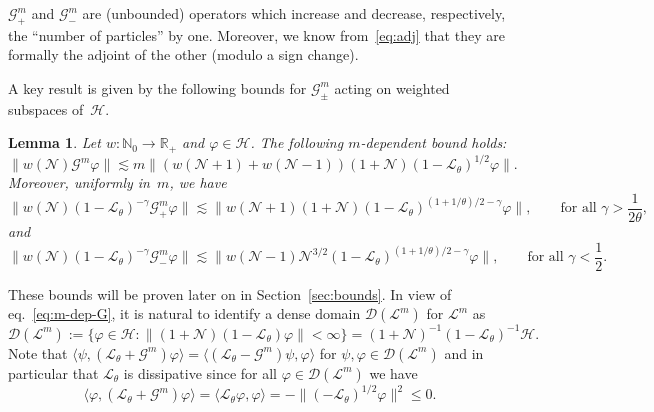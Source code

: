 \documentclass[10pt]{article}
\newcommand{\assign}{:=}
\newtheorem{lemma}{Lemma}
\begin{document}
\begin{remark}
  $\mathcal{G}_+^m$ and $\mathcal{G}_-^m$ are (unbounded) operators which
  increase and decrease, respectively, the ``number of particles'' by one.
  Moreover, we know from~{\eqref{eq:adj}} that they are formally the adjoint
  of the other (modulo a sign change).
\end{remark}

A key result is given by the following bounds for $\mathcal{G}_{\pm}^m$ acting
on weighted subspaces of~$\mathcal{H}$.

\begin{lemma}
  \label{lem:uniform-bds-G}Let $w : \mathbb{N}_0 \rightarrow \mathbb{R}_+$ and
  $\varphi \in \mathcal{H}$. The following $m$-dependent bound holds:
  \begin{equation}
    \| w (\mathcal{N}) \mathcal{G}^m \varphi \| \lesssim m \| (w (\mathcal{N}+
    1) + w (\mathcal{N}- 1)) (1 +\mathcal{N}) (1 -\mathcal{L}_{\theta})^{1 /
    2} \varphi \| . \label{eq:m-dep-G}
  \end{equation}
  Moreover, uniformly in~$m$, we have
  \begin{equation}
    \| w (\mathcal{N}) (1 -\mathcal{L}_{\theta})^{- \gamma} \mathcal{G}_+^m
    \varphi \| \lesssim \| w (\mathcal{N}+ 1) (1 +\mathcal{N}) (1
    -\mathcal{L}_{\theta})^{(1 + 1 / \theta) / 2 - \gamma} \varphi \|, \qquad
    \text{for all } \gamma > \frac{1}{2 \theta}, \label{eq:unifbdG1}
  \end{equation}
  and
  \begin{equation}
    \| w (\mathcal{N}) (1 -\mathcal{L}_{\theta})^{- \gamma} \mathcal{G}_-^m
    \varphi \| \lesssim \| w (\mathcal{N}- 1) \mathcal{N}^{3 / 2} (1
    -\mathcal{L}_{\theta})^{(1 + 1 / \theta) / 2 - \gamma} \varphi \|, \qquad
    \text{for all } \gamma < \frac{1}{2} . \label{eq:unifbdG2}
  \end{equation}
\end{lemma}

These bounds will be proven later on in Section~\ref{sec:bounds}. In view of
eq.~{\eqref{eq:m-dep-G}}, it is natural to identify a dense domain
$\mathcal{D} (\mathcal{L}^m)$ for $\mathcal{L}^m$ as
\[ \mathcal{D} (\mathcal{L}^m) \assign \{ \varphi \in \mathcal{H}: \| (1
   +\mathcal{N}) (1 -\mathcal{L}_{\theta}) \varphi \| < \infty \} = (1
   +\mathcal{N})^{- 1} (1 -\mathcal{L}_{\theta})^{- 1} \mathcal{H}. \]
Note that $\langle \psi, (\mathcal{L}_{\theta} +\mathcal{G}^m) \varphi \rangle
= \langle (\mathcal{L}_{\theta} -\mathcal{G}^m) \psi, \varphi \rangle$ for
$\psi, \varphi \in \mathcal{D} (\mathcal{L}^m)$ and in particular that
$\mathcal{L}_{\theta}$ is dissipative since for all $\varphi \in \mathcal{D}
(\mathcal{L}^m)$ we have
\[ \langle \varphi, (\mathcal{L}_{\theta} +\mathcal{G}^m) \varphi \rangle =
   \langle \mathcal{L}_{\theta} \varphi, \varphi \rangle = - \|
   (-\mathcal{L}_{\theta})^{1 / 2} \varphi \|^2 \leqslant 0. \]
\end{document}

